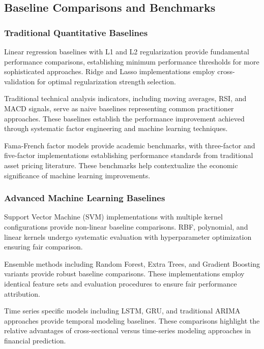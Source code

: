 \documentclass[conference]{IEEEtran}
\begin{document}
\subsection{Baseline Comparisons and Benchmarks}

\subsubsection{Traditional Quantitative Baselines}

Linear regression baselines with L1 and L2 regularization provide fundamental performance comparisons, establishing minimum performance thresholds for more sophisticated approaches. Ridge and Lasso implementations employ cross-validation for optimal regularization strength selection.

Traditional technical analysis indicators, including moving averages, RSI, and MACD signals, serve as naive baselines representing common practitioner approaches. These baselines establish the performance improvement achieved through systematic factor engineering and machine learning techniques.

Fama-French factor models provide academic benchmarks, with three-factor and five-factor implementations establishing performance standards from traditional asset pricing literature. These benchmarks help contextualize the economic significance of machine learning improvements.

\subsubsection{Advanced Machine Learning Baselines}

Support Vector Machine (SVM) implementations with multiple kernel configurations provide non-linear baseline comparisons. RBF, polynomial, and linear kernels undergo systematic evaluation with hyperparameter optimization ensuring fair comparison.

Ensemble methods including Random Forest, Extra Trees, and Gradient Boosting variants provide robust baseline comparisons. These implementations employ identical feature sets and evaluation procedures to ensure fair performance attribution.

Time series specific models including LSTM, GRU, and traditional ARIMA approaches provide temporal modeling baselines. These comparisons highlight the relative advantages of cross-sectional versus time-series modeling approaches in financial prediction.
\end{document}
